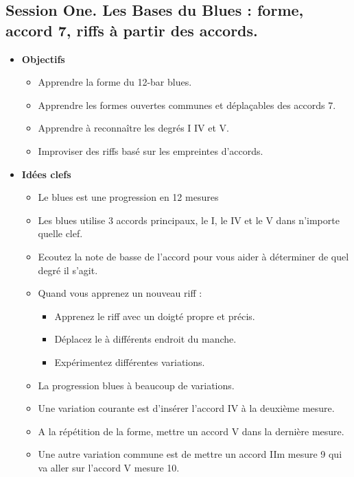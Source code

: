 \documentclass[a4paper]{book}
\begin{document}
\subsection{Session One. Les Bases du Blues : forme, accord 7, riffs à partir des accords.}
	\begin{itemize}
	\item \textbf{Objectifs}
		\begin{itemize}
		\item Apprendre la forme du 12-bar blues.
		\item Apprendre les formes ouvertes communes et d\'eplaçables des accords 7.
		\item Apprendre à reconnaître les degr\'es I IV et V.
		\item Improviser des riffs bas\'e sur les empreintes d'accords.
		\end{itemize}
	\end{itemize}	
	
	
	\begin{itemize}
	\item \textbf{Idées clefs}
		\begin{itemize}
		\item Le blues est une progression en 12 mesures
		\item Les blues utilise 3 accords principaux, le I, le IV et le V dans n'importe quelle clef.
		\item Ecoutez la note de basse de l'accord pour vous aider à d\'eterminer de quel degr\'e il s'agit.
		\item Quand vous apprenez un nouveau riff :
		
			\begin{itemize}
			\item Apprenez le riff avec un doigt\'e propre et pr\'ecis.
			\item D\'eplacez le à diff\'erents endroit du manche.
			\item Exp\'erimentez diff\'erentes variations.
			\end{itemize}
			
		\item La progression blues à beaucoup de variations.
		\item Une variation courante est d'ins\'erer l'accord IV à la deuxième mesure.
		\item A la répétition de la forme, mettre un accord V dans la dernière mesure.
		\item Une autre variation commune est de mettre un accord IIm mesure 9 qui va aller sur l'accord V mesure 10.
		\end{itemize}
		
	\end{itemize}
	
\end{document}
